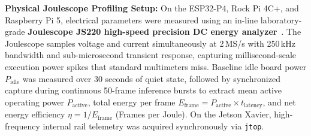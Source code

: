 \documentclass[journal,twoside,web]{ieeecolor}
\begin{document}
\textbf{Physical Joulescope Profiling Setup:} On the ESP32-P4, Rock Pi 4C+, and Raspberry Pi 5, electrical parameters were measured using an in-line laboratory-grade \textbf{Joulescope JS220 high-speed precision DC energy analyzer}~\cite{joulescope2024}. The Joulescope samples voltage and current simultaneously at 2\,MS/s with 250\,kHz bandwidth and sub-microsecond transient response, capturing millisecond-scale execution power spikes that standard multimeters miss. Baseline idle board power $P_{\text{idle}}$ was measured over 30 seconds of quiet state, followed by synchronized capture during continuous 50-frame inference bursts to extract mean active operating power $P_{\text{active}}$, total energy per frame $E_{\text{frame}} = P_{\text{active}} \times t_{\text{latency}}$, and net energy efficiency $\eta = 1 / E_{\text{frame}}$ (Frames per Joule). On the Jetson Xavier, high-frequency internal rail telemetry was acquired synchronously via \texttt{jtop}.
\end{document}
